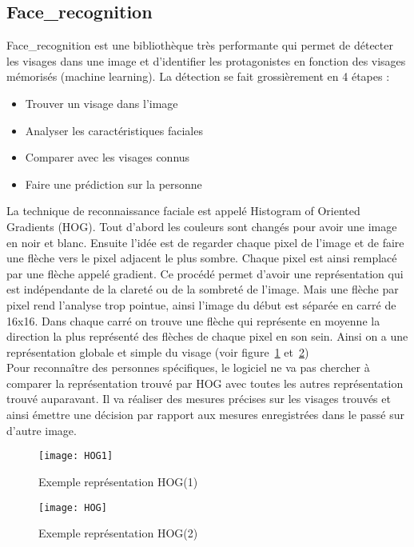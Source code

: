 \subsection{Face\_recognition}
Face\_recognition est une bibliothèque très performante qui permet de détecter
les visages dans une image et d'identifier les protagonistes en fonction des
visages mémorisés (machine learning). La détection se fait grossièrement en
4 étapes :
\begin{itemize}
  \item{Trouver un visage dans l'image}
  \item{Analyser les caractéristiques faciales}
  \item{Comparer avec les visages connus}
  \item{Faire une prédiction sur la personne}
\end{itemize}
\vspace{0.5cm}
La technique de reconnaissance faciale est appelé Histogram of Oriented Gradients
(HOG). Tout d'abord les couleurs sont changés pour avoir une image en noir et blanc.
Ensuite l'idée est de regarder chaque pixel de l'image et de faire une flèche vers
le pixel adjacent le plus sombre. Chaque pixel est ainsi remplacé par une flèche
appelé gradient. Ce procédé permet d'avoir une représentation qui est indépendante
de la clareté ou de la sombreté de l'image. Mais une flèche par pixel rend
l'analyse trop pointue, ainsi l'image du début est séparée en carré de 16x16.
Dans chaque carré on trouve une flèche qui représente en moyenne la direction
la plus représenté des flèches de chaque pixel en son sein. Ainsi on a une
représentation globale et simple du visage (voir figure~\ref{fig:HOG} et~\ref{fig:HOG1})
\\
Pour reconnaître des personnes spécifiques, le logiciel ne va pas chercher à
comparer la représentation trouvé par HOG avec toutes les autres représentation
trouvé auparavant. Il va réaliser des mesures précises sur les visages trouvés
et ainsi émettre une décision par rapport aux mesures enregistrées dans le passé
sur d'autre image.
\\
\newpage
\begin{figure}[h]
  \begin{center}
  \texttt{[image: HOG1]}
  \caption{Exemple représentation HOG(1)}
  \label{fig:HOG}
\end{center}
\end{figure}

\begin{figure}[h]
  \begin{center}
  \texttt{[image: HOG]}
  \caption{Exemple représentation HOG(2)}
  \label{fig:HOG1}
\end{center}
\end{figure}
\newpage
